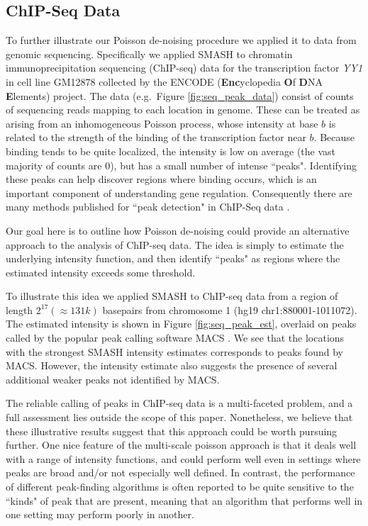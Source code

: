 \documentclass[12pt]{article}
\begin{document}
\subsection{ChIP-Seq Data}

To further illustrate our Poisson de-noising procedure we applied it to data from genomic sequencing. Specifically we applied SMASH to chromatin immunoprecipitation sequencing (ChIP-seq) data for the transcription factor {\it YY1} in cell line GM12878
collected by the ENCODE (\textbf{Enc}yclopedia \textbf{O}f \textbf{D}NA \textbf{E}lements) project. 
The data (e.g.~Figure \ref{fig:seq_peak_data}) consist of counts of sequencing reads mapping to each location in genome. These can be treated as
arising from an inhomogeneous Poisson process, whose intensity at base $b$ is related to the strength of the binding 
of the transcription factor near $b$. Because binding tends to be quite localized, the intensity is low on average (the vast majority of 
counts are 0), but has a small number of intense ``peaks". Identifying these peaks can help discover regions where 
binding occurs, which is an important component of understanding gene regulation. Consequently there are
many methods published for ``peak detection" in ChIP-Seq data \cite{Wilbanks2010Evaluation}. 

Our goal here is to outline how Poisson de-noising could provide an alternative approach to the analysis of ChIP-seq data.
The idea is simply to estimate the underlying intensity function, and then identify ``peaks" as regions where the estimated intensity
exceeds some threshold. 

To illustrate this idea we applied SMASH to ChIP-seq data from a region of length $2^{17} (\approx 131k)$ basepairs from chromosome 1
(hg19 chr1:880001-1011072). The estimated intensity is shown in Figure \ref{fig:seq_peak_est}, overlaid on peaks called by
the popular peak calling software MACS \cite{Zhang2008Modelbased}. We see that the locations with the strongest SMASH intensity estimates 
corresponds to peaks found by MACS.
However, the intensity estimate also suggests the presence of several additional weaker peaks not identified by MACS.

The reliable calling of peaks in ChIP-seq data is a multi-faceted problem, and a full assessment lies outside the scope of this paper.
Nonetheless, we believe that these illustrative results suggest that this approach could be worth pursuing further. 
One nice feature of the multi-scale poisson approach is that it deals well with a range of intensity functions, and could
perform well even in settings where peaks are broad and/or not especially well defined. In contrast, the performance of 
different peak-finding algorithms is often reported to be quite sensitive to the ``kinds" of peak
that are present, meaning that an algorithm that performs well in one setting may perform poorly in another.
\end{document}

